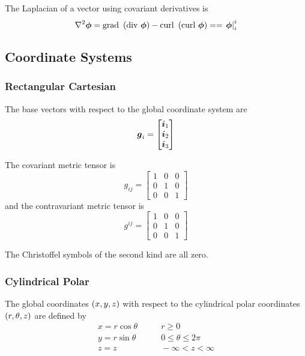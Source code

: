 The Laplacian of a vector using covariant derivatives is
\begin{equation}
  \laplacian{\vect{\phi}}=\text{grad }\pbrac{\text{div }\vect{\phi}}-\text{curl } \pbrac{\text{curl }\vect{\phi}}==\mixedderiv{\vect{\phi}}{i}{i}
\end{equation}

\subsection{Coordinate Systems}

\subsubsection{Rectangular Cartesian}

The base vectors with respect to the global coordinate system are
\begin{equation}
  \vect{g}_{i}=\begin{bmatrix} 
    \vect{i}_{1} \\ 
    \vect{i}_{2} \\
    \vect{i}_{3} 
  \end{bmatrix}
\end{equation}

The covariant metric tensor is
\begin{equation}
  g_{ij}=\begin{bmatrix}
    1 & 0 & 0 \\
    0 & 1 & 0 \\
    0 & 0 & 1
  \end{bmatrix}
\end{equation}
and the contravariant metric tensor is
\begin{equation}
  g^{ij}=\begin{bmatrix}
    1 & 0 & 0 \\
    0 & 1 & 0 \\
    0 & 0 & 1
  \end{bmatrix}
\end{equation}

The Christoffel symbols of the second kind are all zero.

\subsubsection{Cylindrical Polar}

The global coordinates  $\left( x,y,z \right)$ with respect to the cylindrical polar
coordinates $\left( r,\theta,z \right)$ are defined by
\begin{equation}
  \begin{aligned}
    x = r\cos\theta  & \qquad r \ge0 \\
    y = r\sin\theta & \qquad 0 \le\theta\le2\pi \\
    z = z          & \qquad -\infty < z < \infty
  \end{aligned}
\end{equation}


